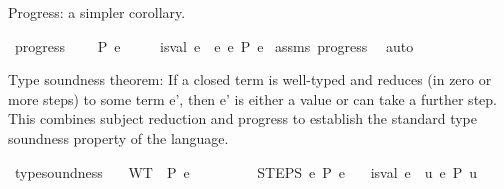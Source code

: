 \begin{isabellebody}
\begin{isamarkuptext}
Progress: a simpler corollary.%
\end{isamarkuptext}\isamarkuptrue%
\isamarkupfalse%
\ progress{\isacharprime}{\kern0pt}{\isacharcolon}{\kern0pt}\isanewline
\ \ \ {\isachardoublequoteopen}{\isacharbrackleft}{\kern0pt}{\isacharbrackright}{\kern0pt}\ {\isasymturnstile}{\isacharbraceleft}{\kern0pt}P{\isacharbraceright}{\kern0pt}\ e\ {\isacharcolon}{\kern0pt}\ {\isasymtau}{\isachardoublequoteclose}\isanewline
\ \ \ {\isachardoublequoteopen}is{\isacharunderscore}{\kern0pt}val\ e\ {\isasymor}\ {\isacharparenleft}{\kern0pt}{\isasymexists}e{\isacharprime}{\kern0pt}{\isachardot}{\kern0pt}\ e\ {\isacharminus}{\kern0pt}{\isachargreater}{\kern0pt}{\isacharbraceleft}{\kern0pt}P{\isacharbraceright}{\kern0pt}\ e{\isacharprime}{\kern0pt}{\isacharparenright}{\kern0pt}{\isachardoublequoteclose}\isanewline
%
\isadelimproof
%
\endisadelimproof
%
\isatagproof
{}\isamarkupfalse%
\ assms\ progress\ \isamarkupfalse%
\ auto%
\endisatagproof
{\isafoldproof}%
%
\isadelimproof
%
\endisadelimproof
%
\isadelimdocument
%
\endisadelimdocument
%
\isatagdocument
%
\isamarkuptrue%
%
\endisatagdocument
{\isafolddocument}%
%
\isadelimdocument
%
\endisadelimdocument
%
\begin{isamarkuptext}%
Type soundness theorem:
  If a closed term is well-typed and reduces (in zero or more steps)
  to some term e', then e' is either a value or can take a further step.
  This combines subject reduction and progress to establish
  the standard type soundness property of the language.%
\end{isamarkuptext}\isamarkuptrue%
\isamarkupfalse%
\ type{\isacharunderscore}{\kern0pt}soundness{\isacharcolon}{\kern0pt}\isanewline
\ \ \ WT{\isacharcolon}{\kern0pt}\ {\isachardoublequoteopen}{\isacharbrackleft}{\kern0pt}{\isacharbrackright}{\kern0pt}\ {\isasymturnstile}{\isacharbraceleft}{\kern0pt}P{\isacharbraceright}{\kern0pt}\ e\ {\isacharcolon}{\kern0pt}\ {\isasymtau}{\isachardoublequoteclose}\isanewline
\ \ \ \ \ \ \ STEPS{\isacharcolon}{\kern0pt}\ {\isachardoublequoteopen}e\ {\isacharminus}{\kern0pt}{\isachargreater}{\kern0pt}{\isacharbraceleft}{\kern0pt}P{\isacharbraceright}{\kern0pt}{\isacharasterisk}{\kern0pt}\ e{\isacharprime}{\kern0pt}{\isachardoublequoteclose}\isanewline
\ \ \ {\isachardoublequoteopen}is{\isacharunderscore}{\kern0pt}val\ e{\isacharprime}{\kern0pt}\ {\isasymor}\ {\isacharparenleft}{\kern0pt}{\isasymexists}u{\isachardot}{\kern0pt}\ e{\isacharprime}{\kern0pt}\ {\isacharminus}{\kern0pt}{\isachargreater}{\kern0pt}{\isacharbraceleft}{\kern0pt}P{\isacharbraceright}{\kern0pt}\ u{\isacharparenright}{\kern0pt}{\isachardoublequoteclose}\isanewline

\end{isabellebody}
